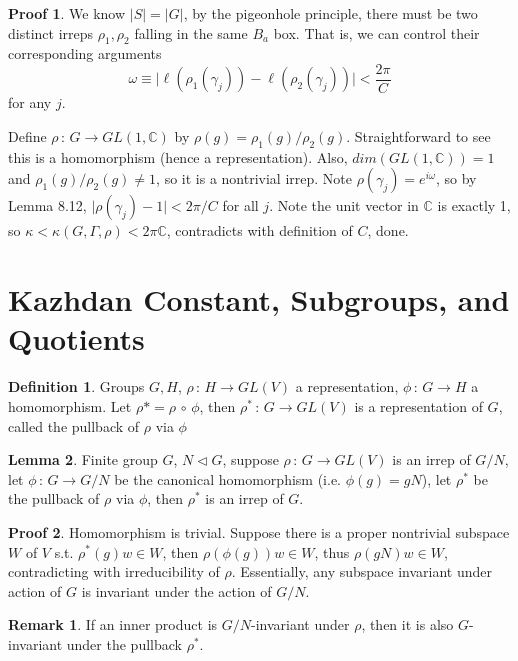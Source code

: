 \documentclass{book}
\newcommand{\C}{\mathbb{C}}
\newcommand{\abs}[1]{\lvert #1 \rvert }
\theoremstyle{definition}
\newtheorem{lemma}{Lemma}[chapter]
\newtheorem{definition}[lemma]{Definition}
\theoremstyle{remarkstyle}
\newtheorem*{remark}{Remark}%
\newtheorem*{myproof}{Proof}%
\begin{document}
\begin{myproof}
We know $\abs{S}=\abs{G}$, by the pigeonhole principle, there must be two distinct irreps $\rho_1,\rho_2$ falling in the same $B_a$ box. That is, we can control their corresponding arguments
$$
\omega \equiv \abs{\ell(\rho_1(\gamma_j)) - \ell(\rho_2(\gamma_j)) } < \frac{2\pi}{C}
$$
for any $j$. \newline 

Define $\rho\,:\, G\rightarrow GL(1,\C)$ by $\rho(g) = \rho_1(g)/\rho_2(g)$. Straightforward to see this is a homomorphism (hence a representation). Also, $dim(GL(1,\C))=1$ and $\rho_1(g)/\rho_2(g)\neq 1$, so it is a nontrivial irrep. Note $\rho(\gamma_j) = e^{i\omega} $, so by Lemma 8.12, $\abs{\rho(\gamma_j)-1}<2\pi/C$ for all $j$. Note the unit vector in $\C$ is exactly 1, so $\kappa < \kappa(G,\Gamma,\rho) < 2\pi\C$, contradicts with definition of $C$, done. \newline 

\end{myproof}





\section{Kazhdan Constant, Subgroups, and Quotients}
\begin{definition}
    Groups $G,H$, $\rho\,:\, H\rightarrow GL(V)$ a representation, $\phi\,:\, G\rightarrow H$ a homomorphism. Let $\rho* = \rho \,  \circ \, \phi $, then $\rho^*\,:\, G\rightarrow GL(V)$ is a representation of $G$, called the pullback of $\rho$ via $\phi$ \newline 
\end{definition}

\begin{lemma}
    Finite group $G$, $N\vartriangleleft G$, suppose $\rho\,:\, G\rightarrow GL(V)$ is an irrep of $G/N$, let $\phi\,:\, G\rightarrow G/N$ be the canonical homomorphism (i.e. $\phi(g) = gN$), let $\rho^*$ be the pullback of $\rho$ via $\phi$, then $\rho^*$ is an irrep of $G$.
\end{lemma}
\begin{myproof}
    Homomorphism is trivial. Suppose there is a proper nontrivial subspace $W$ of $V$ s.t. $\rho^*(g)w \in W$, then $\rho(\phi(g))w\in W$, thus $\rho(gN)w\in W$, contradicting with irreducibility of $\rho$. Essentially, any subspace invariant under action of $G$ is invariant under the action of $G/N$.
\end{myproof}
\begin{remark}
    If an inner product is $G/N$-invariant under $\rho$, then it is also $G$-invariant under the pullback $\rho^*$. \newline 
\end{remark}
\end{document}
